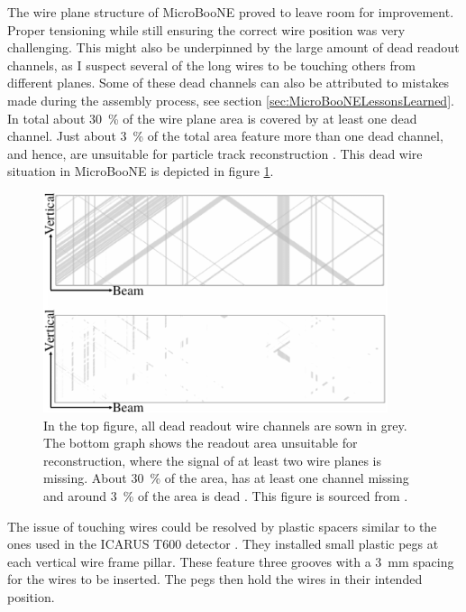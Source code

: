 The wire plane structure of MicroBooNE proved to leave room for improvement. Proper tensioning while still ensuring the correct wire position was very challenging. This might also be underpinned by the large amount of dead readout channels, as I suspect several of the long wires to be touching others from different planes. Some of these dead channels can also be attributed to mistakes made during the assembly process, see section \ref{sec:MicroBooNELessonsLearned}. In total about \SI{30}{\percent} of the wire plane area is covered by at least one dead channel. Just about \SI{3}{\percent} of the total area feature more than one dead channel, and hence, are unsuitable for particle track reconstruction \cite{MicroBooNEDeadWires}. This dead wire situation in MicroBooNE is depicted in figure \ref{fig:DeadWires}.
\begin{figure}[htbp]
    \centering
    \includegraphics[width=0.9\textwidth]{images/MicroBooNE/DeadWires.pdf}
    \caption[Dead Wires of MicroBooNE]{In the top figure, all dead readout wire channels are sown in grey. The bottom graph shows the readout area unsuitable for reconstruction, where the signal of at least two wire planes is missing. About \SI{30}{\percent} of the area, has at least one channel missing and around \SI{3}{\percent} of the area is dead \cite{MicroBooNEDeadWires}. This figure is sourced from \cite{MicroBooNEDeadWires}.}
    \label{fig:DeadWires}
\end{figure}
The issue of touching wires could be resolved by plastic spacers similar to the ones used in the ICARUS T600 detector \cite{ICARUST600}. They installed small plastic pegs at each vertical wire frame pillar. These feature three grooves with a \SI{3}{\milli\metre} spacing for the wires to be inserted. The pegs then hold the wires in their intended position.


